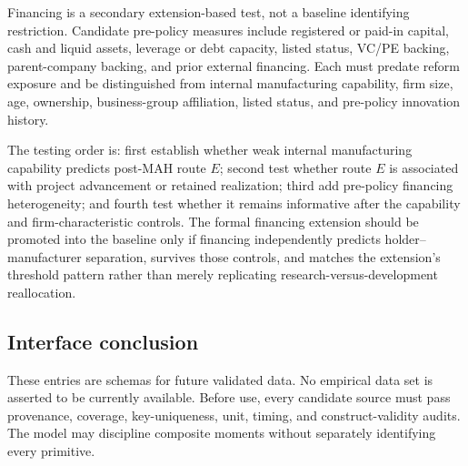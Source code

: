 Financing is a secondary extension-based test, not a baseline identifying
restriction. Candidate pre-policy measures include registered or paid-in
capital, cash and liquid assets, leverage or debt capacity, listed status,
VC/PE backing, parent-company backing, and prior external financing. Each must
predate reform exposure and be distinguished from internal manufacturing
capability, firm size, age, ownership, business-group affiliation, listed
status, and pre-policy innovation history.

The testing order is: first establish whether weak internal manufacturing
capability predicts post-MAH route \(E\); second test whether route \(E\) is
associated with project advancement or retained realization; third add
pre-policy financing heterogeneity; and fourth test whether it remains
informative after the capability and firm-characteristic controls. The formal
financing extension should be promoted into the baseline only if financing
independently predicts holder--manufacturer separation, survives those
controls, and matches the extension's threshold pattern rather than merely
replicating research-versus-development reallocation.

\subsection{Interface conclusion}
\label{subsec:p10-conclusion}

These entries are schemas for future validated data. No empirical data set is
asserted to be currently available. Before use, every candidate source must pass provenance,
coverage, key-uniqueness, unit, timing, and construct-validity audits. The
model may discipline composite moments without separately identifying every
primitive.
